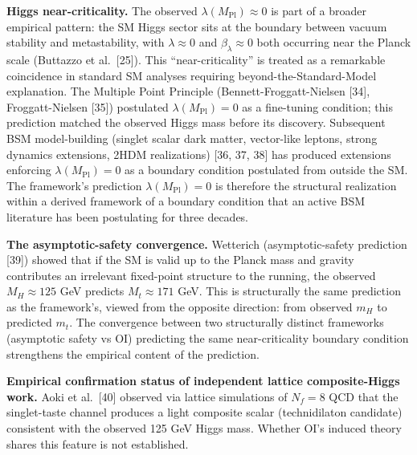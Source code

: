 \documentclass[
]{article}
\begin{document}
\textbf{Higgs near-criticality.} The observed
\(\lambda(M_{\text{Pl}}) \approx 0\) is part of a broader empirical
pattern: the SM Higgs sector sits at the boundary between vacuum
stability and metastability, with \(\lambda \approx 0\) and
\(\beta_\lambda \approx 0\) both occurring near the Planck scale
(Buttazzo et al.~{[}25{]}). This ``near-criticality'' is treated as a
remarkable coincidence in standard SM analyses requiring
beyond-the-Standard-Model explanation. The Multiple Point Principle
(Bennett-Froggatt-Nielsen {[}34{]}, Froggatt-Nielsen {[}35{]})
postulated \(\lambda(M_{\text{Pl}}) = 0\) as a fine-tuning condition;
this prediction matched the observed Higgs mass before its discovery.
Subsequent BSM model-building (singlet scalar dark matter, vector-like
leptons, strong dynamics extensions, 2HDM realizations) {[}36, 37, 38{]}
has produced extensions enforcing \(\lambda(M_{\text{Pl}}) = 0\) as a
boundary condition postulated from outside the SM. The framework's
prediction \(\lambda(M_{\text{Pl}}) = 0\) is therefore the structural
realization within a derived framework of a boundary condition that an
active BSM literature has been postulating for three decades.

\textbf{The asymptotic-safety convergence.} Wetterich (asymptotic-safety
prediction {[}39{]}) showed that if the SM is valid up to the Planck
mass and gravity contributes an irrelevant fixed-point structure to the
running, the observed \(M_H \approx 125\) GeV predicts
\(M_t \approx 171\) GeV. This is structurally the same prediction as the
framework's, viewed from the opposite direction: from observed \(m_H\)
to predicted \(m_t\). The convergence between two structurally distinct
frameworks (asymptotic safety vs OI) predicting the same
near-criticality boundary condition strengthens the empirical content of
the prediction.

\textbf{Empirical confirmation status of independent lattice
composite-Higgs work.} Aoki et al.~{[}40{]} observed via lattice
simulations of \(N_f = 8\) QCD that the singlet-taste channel produces a
light composite scalar (technidilaton candidate) consistent with the
observed 125 GeV Higgs mass. Whether OI's induced theory shares this
feature is not established.
\end{document}
